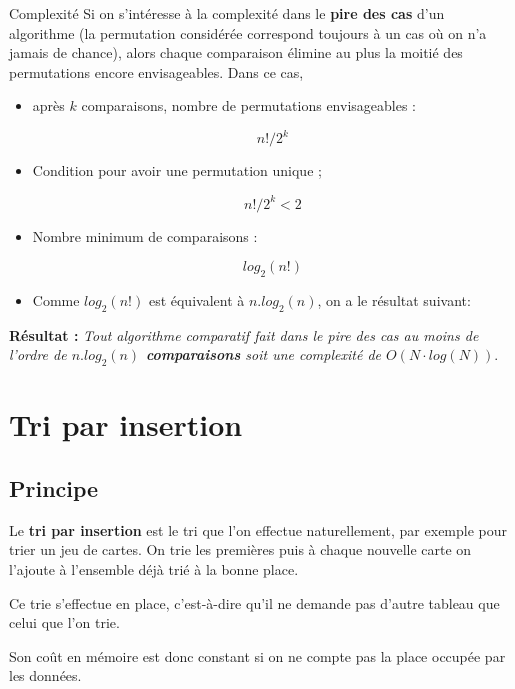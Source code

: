 \begin{prop}{Complexité}
Si on s'intéresse à la complexité dans le \textbf{pire des cas} d'un algorithme (la permutation considérée correspond toujours à un cas où on n'a jamais de chance), alors chaque comparaison élimine au plus la moitié des permutations encore envisageables. Dans ce cas, 

\begin{itemize}
\item après $k$ comparaisons, nombre de permutations envisageables : 

\ifprof
$$n! / 2^k$$
\fi

\item Condition pour avoir une permutation unique ;

\ifprof
$$n! / 2^k < 2$$ 
\fi

\item Nombre minimum de comparaisons :

\ifprof
$$log_2(n!)$$ 
\fi


\item Comme $log_2(n!)$ est équivalent à $n.log_2(n)$, on a le résultat suivant:
\end{itemize}

\textbf{Résultat :}\textit{ Tout algorithme comparatif fait dans le pire des cas au moins de l'ordre de
\textbf{$n.log_2(n)$ comparaisons} soit une complexité de \textbf{$O(N\cdot log(N))$}}.
\end{prop}

\section{Tri par insertion}
\subsection{Principe}

\begin{definition2}
Le \textbf{tri par insertion} est le tri que l'on effectue naturellement, par exemple pour trier un jeu de cartes. On trie les premières puis à chaque nouvelle carte on l'ajoute à l'ensemble déjà trié à la bonne place. 

Ce trie s'effectue en place, c'est-à-dire qu'il ne demande pas d'autre tableau que celui que l'on trie. 

Son coût en mémoire est donc constant si on ne compte pas la place occupée par les données.
\end{definition2}


